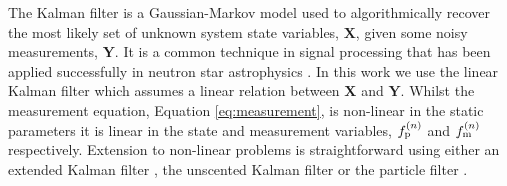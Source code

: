 \documentclass[fleqn,usenatbib,useAMS]{mnras}
\begin{document}
The Kalman filter \citep{Kalman1} is a Gaussian-Markov model used to algorithmically recover the most likely set of unknown system state variables, $\boldsymbol{X}$, given some noisy measurements, $\boldsymbol{Y}$. It is a common technique in signal processing that has been applied successfully in neutron star astrophysics \citep[e.g.][]{Meyers2021,Melatos2023}. In this work we use the linear Kalman filter which assumes a linear relation between $\boldsymbol{X}$ and $\boldsymbol{Y}$. Whilst the measurement equation, Equation \eqref{eq:measurement}, is non-linear in the static parameters it is linear in the state and measurement variables, $f_{\rm p}^{(n)}$ and $f_{\rm m}^{(n)}$ respectively. Extension to non-linear problems is straightforward using either an extended Kalman filter \citep{zarchan2000fundamentals}, the unscented Kalman filter \citep{882463van} or the particle filter \citep{Simon10}. \newline 
\end{document}
